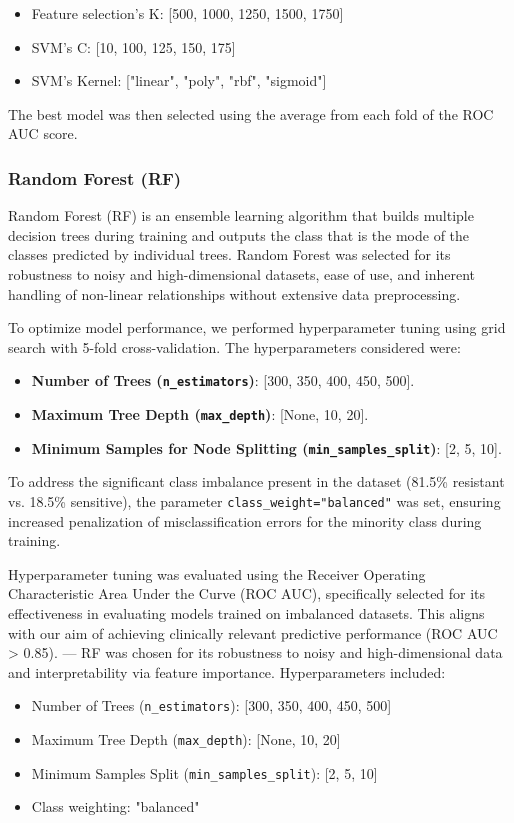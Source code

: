 \documentclass{article}
\begin{document}
\begin{itemize}
  \item Feature selection's K: [500, 1000, 1250, 1500, 1750]
  \item SVM's C: [10, 100, 125, 150, 175]
  \item SVM's Kernel: ["linear", "poly", "rbf", "sigmoid"]
\end{itemize}

The best model was then selected using the average from each fold of the ROC AUC score. 

\subsubsection{Random Forest (RF)}
Random Forest (RF) is an ensemble learning algorithm that builds multiple decision trees during training and outputs the class that is the mode of the classes predicted by individual trees. Random Forest was selected for its robustness to noisy and high-dimensional datasets, ease of use, and inherent handling of non-linear relationships without extensive data preprocessing.

To optimize model performance, we performed hyperparameter tuning using grid search with 5-fold cross-validation. The hyperparameters considered were:

\begin{itemize}
    \item \textbf{Number of Trees (\texttt{n\_estimators})}: [300, 350, 400, 450, 500].
    \item \textbf{Maximum Tree Depth (\texttt{max\_depth})}: [None, 10, 20].
    \item \textbf{Minimum Samples for Node Splitting (\texttt{min\_samples\_split})}: [2, 5, 10].
\end{itemize}

To address the significant class imbalance present in the dataset (81.5\% resistant vs. 18.5\% sensitive), the parameter \texttt{class\_weight="balanced"} was set, ensuring increased penalization of misclassification errors for the minority class during training.

Hyperparameter tuning was evaluated using the Receiver Operating Characteristic Area Under the Curve (ROC AUC), specifically selected for its effectiveness in evaluating models trained on imbalanced datasets. This aligns with our aim of achieving clinically relevant predictive performance (ROC AUC > 0.85).
---
RF was chosen for its robustness to noisy and high-dimensional data and interpretability via feature importance. Hyperparameters included:
\begin{itemize}
    \item Number of Trees (\texttt{n\_estimators}): [300, 350, 400, 450, 500]
    \item Maximum Tree Depth (\texttt{max\_depth}): [None, 10, 20]
    \item Minimum Samples Split (\texttt{min\_samples\_split}): [2, 5, 10]
    \item Class weighting: "balanced"
\end{itemize}
\end{document}
